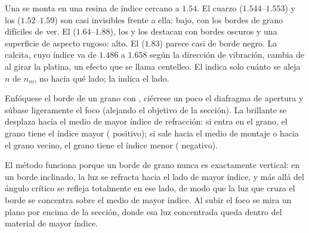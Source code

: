 Una  se monta en una resina de índice cercano a $1.54$.
El cuarzo ($1.544$--$1.553$) y los  ($1.52$--$1.59$) son casi invisibles frente a ella:  bajo, con los
bordes de grano difíciles de ver. El  ($1.64$--$1.88$), los  y los  destacan con bordes oscuros y
una superficie de aspecto rugoso:  alto. El  ($1.83$) parece casi de borde negro. La calcita, cuyo índice va
de $1.486$ a $1.658$ según la dirección de vibración, cambia de  al girar la platina, un efecto que se llama centelleo.
El  indica solo cuánto se aleja $n$ de $n_m$, no hacia qué lado; la  indica el lado.

\begin{method}\label{met:b1:optical-mineralogy:becke}
Enfóquese el borde de un grano con , ciérrese un poco el diafragma de apertura y súbase ligeramente el
foco (alejando el objetivo de la sección). La  brillante se desplaza hacia el medio de mayor índice de
refracción: si entra en el grano, el grano tiene el índice mayor ( positivo); si sale hacia el medio de montaje o
hacia el grano vecino, el grano tiene el índice menor ( negativo).
\end{method}

El método funciona porque un borde de grano nunca es exactamente vertical: en un borde inclinado, la luz se refracta hacia
el lado de mayor índice, y más allá del ángulo crítico se refleja totalmente en ese lado, de modo que la luz que cruza el
borde se concentra sobre el medio de mayor índice. Al subir el foco se mira un plano por encima de la sección, donde esa
luz concentrada queda dentro del material de mayor índice.

